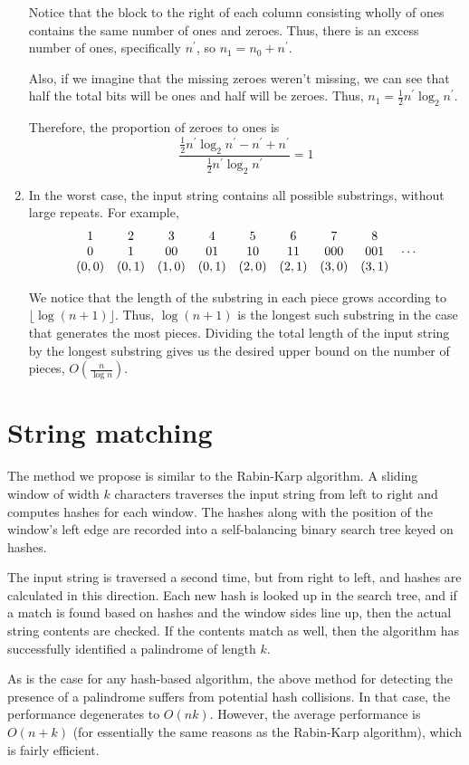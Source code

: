 \documentclass{article}
\begin{document}
\begin{enumerate}
        Notice that the block to the right of each column consisting wholly of
        ones contains the same number of ones and zeroes. Thus, there is an
        excess number of ones, specifically $n^\prime$, so
        $n_1 = n_0 + n^\prime$.

        Also, if we imagine that the missing zeroes weren't missing, we can
        see that half the total bits will be ones and half will be zeroes.
        Thus, $n_1 = \frac{1}{2} n^\prime \log_2 {n^\prime}$.

        Therefore, the proportion of zeroes to ones is
        $$
        \frac{\frac{1}{2} n^\prime \log_2 {n^\prime} - n^\prime + n^\prime}
        {\frac{1}{2} n^\prime \log_2 {n^\prime}} = 1
        $$

    \item In the worst case, the input string contains all possible substrings,
        without large repeats. For example,
        $$
        \begin{array}{c c c c c c c c c}
            1 & 2 & 3  & 4  & 5  & 6  & 7   & 8   & ~ \\
            0 & 1 & 00 & 01 & 10 & 11 & 000 & 001 & \cdots \\
            (0, 0) & (0, 1) & (1, 0) & (0, 1) & (2, 0) & (2, 1) & (3, 0) & (3,
            1) & ~
        \end{array}
        $$

        We notice that the length of the substring in each piece grows
        according to $\lfloor \log (n + 1) \rfloor$. Thus, $\log {(n+1)}$ is
        the longest such substring in the case that generates the most pieces.
        Dividing the total length of the input string by the longest substring
        gives us the desired upper bound on the number of pieces,
        $O(\frac{n}{\log n})$.

\end{enumerate}

\section{String matching}

The method we propose is similar to the Rabin-Karp algorithm. A sliding window
of width $k$ characters traverses the input string from left to right
and computes hashes for each window. The hashes along with the position of the
window's left edge are recorded into a self-balancing binary search tree keyed
on hashes.

The input string is traversed a second time, but from right to left,
and hashes are calculated in this direction. Each new hash is looked up in the
search tree, and if a match is found based on hashes and the window sides line
up, then the actual string contents are checked. If the contents match as well,
then the algorithm has successfully identified a palindrome of length $k$.

As is the case for any hash-based algorithm, the above method for detecting the
presence of a palindrome suffers from potential hash collisions. In that case,
the performance degenerates to $O(nk)$. However, the average performance is
$O(n + k)$ (for essentially the same reasons as the Rabin-Karp algorithm), which is fairly efficient.
\end{document}

